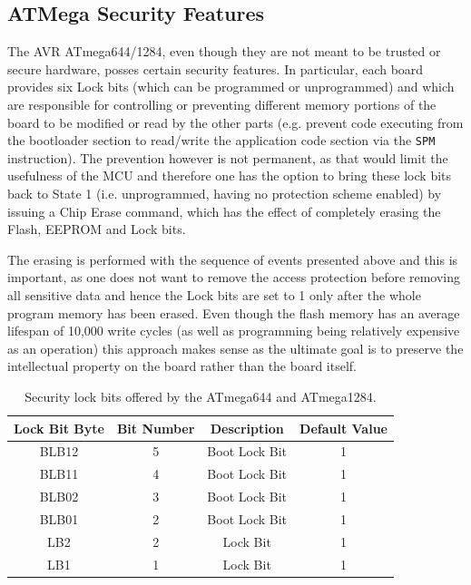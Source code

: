 \documentclass[10pt,a4paper,twocolumn]{article}
\begin{document}
	\subsection{ATMega Security Features}
	
	The AVR ATmega644/1284, even though they are not meant to be trusted or secure hardware, posses certain security features. In particular, each board provides six Lock bits (which can be programmed or unprogrammed) and which are responsible for controlling or preventing different memory portions of the board to be modified or read by the other parts (e.g. prevent code executing from the bootloader section to read/write the application code section via the \texttt{SPM} instruction). The prevention however is not permanent, as that would limit the usefulness of the MCU and therefore one has the option to bring these lock bits back to State 1 (i.e. unprogrammed, having no protection scheme enabled) by issuing a Chip Erase command, which has the effect of completely erasing the Flash, EEPROM and Lock bits.
	
	The erasing is performed with the sequence of events presented above and this is important, as one does not want to remove the access protection before removing all sensitive data and hence the Lock bits are set to 1 only after the whole program memory has been erased. Even though the flash memory has an average lifespan of 10,000 write cycles (as well as programming being relatively expensive as an operation) this approach makes sense as the ultimate goal is to preserve the intellectual property on the board rather than the board itself.
	
	\begin{table}
		\center
		\begin{tabular}{| c | c | c | c |}
			\hline
			\textbf{Lock Bit Byte} & \textbf{Bit Number} & \textbf{Description} & \textbf{Default Value}\\
			\hline \hline
			BLB12 & 5 & Boot Lock Bit & 1\\
			BLB11 & 4 & Boot Lock Bit & 1\\
			BLB02 & 3 & Boot Lock Bit & 1\\
			BLB01 & 2 & Boot Lock Bit & 1\\
			LB2 & 2 & Lock Bit & 1 \\
			LB1 & 1 & Lock Bit & 1 \\
			\hline
		\end{tabular}
		\caption{Security lock bits offered by the ATmega644 and ATmega1284.}
		\label{table:lock_bits}
	\end{table}
	
\end{document}
